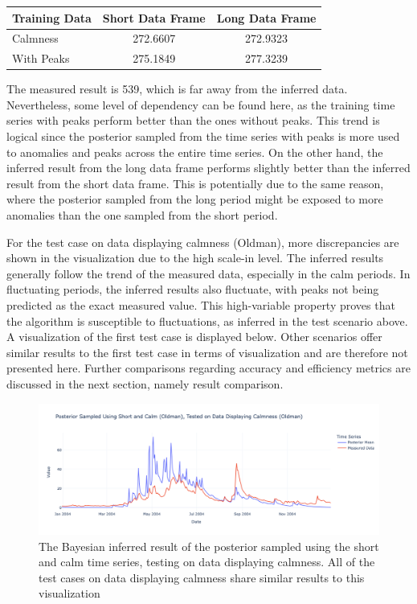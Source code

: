 \begin{center}
\begin{tabular}{@{}lcc@{}}
\toprule
\textbf{Training Data} & \textbf{Short Data Frame} & \textbf{Long Data Frame} \\ \midrule
Calmness           & 272.6607 & 272.9323                  \\
With Peaks             & 275.1849 & 277.3239              \\ \bottomrule
\end{tabular}
\end{center}
The measured result is 539, which is far away from the inferred data. Nevertheless, some level of dependency can be found here, as the training time series with peaks perform better than the ones without peaks. This trend is logical since the posterior sampled from the time series with peaks is more used to anomalies and peaks across the entire time series. On the other hand, the inferred result from the long data frame performs slightly better than the inferred result from the short data frame. This is potentially due to the same reason, where the posterior sampled from the long period might be exposed to more anomalies than the one sampled from the short period. 

For the test case on data displaying calmness (Oldman), more discrepancies are shown in the visualization due to the high scale-in level. The inferred results generally follow the trend of the measured data, especially in the calm periods. In fluctuating periods, the inferred results also fluctuate, with peaks not being predicted as the exact measured value. This high-variable property proves that the algorithm is susceptible to fluctuations, as inferred in the test scenario above. A visualization of the first test case is displayed below. Other scenarios offer similar results to the first test case in terms of visualization and are therefore not presented here. Further comparisons regarding accuracy and efficiency metrics are discussed in the next section, namely result comparison.

\begin{figure}[H]
    \centering
    \includegraphics[width=.7\textwidth]{figures/time_series_analysis/ts_int/0_2.png}
    \captionsetup{width=.8\textwidth}
    \caption{The Bayesian inferred result of the posterior sampled using the short and calm time series, testing on data displaying calmness. All of the test cases on data displaying calmness share similar results to this visualization}
    \label{fig:enter-label}
\end{figure}


